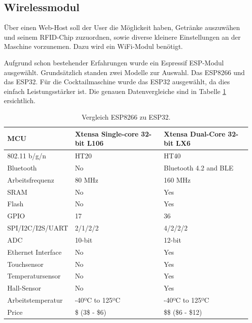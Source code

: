 \subsection{Wirelessmodul}
\label{subsec:Wirelessmodul}

Über einen Web-Host soll der User die Möglickeit haben, Getränke auszuwähen und seinem RFID-Chip zuzuordnen, sowie diverse kleinere Einstellungen an der Maschine vorzunemen. Dazu wird ein WiFi-Modul benötigt.

Aufgrund schon bestehender Erfahrungen wurde ein Espressif ESP-Modul ausgewählt. Grundsätzlich standen zwei Modelle zur Auswahl. Das ESP8266 und das ESP32. Für die Cocktailmaschine wurde das ESP32 ausgewählt, da dies einfach Leistungsstärker ist. Die genauen Datenvergleiche sind in Tabelle \ref{tab:ESP} ersichtlich.

\begin{table}[!h]
\begin{tabularx}{\textwidth}{l|X|X}
MCU                    & Xtensa Single-core 32-bit L106 & Xtensa Dual-Core 32-bit LX6 \\ \hline
802.11 b/g/n     		& HT20                           & HT40                                       \\
Bluetooth              	& No                             & Bluetooth 4.2 and BLE                      \\
Arbeitsfrequenz			& 80 MHz                         & 160 MHz                                    \\
SRAM                   	& No                             & Yes                                         \\
Flash                  	& No                             & Yes                                          \\
GPIO                   	& 17                             & 36                                         \\
SPI/I2C/I2S/UART       	& 2/1/2/2                        & 4/2/2/2                                    \\
ADC                    	& 10-bit                         & 12-bit                                     \\
Ethernet Interface 		& No                             & Yes                                          \\
Touchsensor           	& No                             & Yes                                          \\
Temperatursensor     	& No                             & Yes                                          \\
Hall-Sensor     		& No                             & Yes \\
Arbeitstemperatur    	& -40ºC to 125ºC                 & -40ºC to 125ºC                             \\
Price                  	& \$ (3\$ - \$6)                   & \$\$ (\$6 - \$12)                             
\end{tabularx}
\caption{Vergleich ESP8266 zu ESP32.}
\label{tab:ESP}
\end{table}

